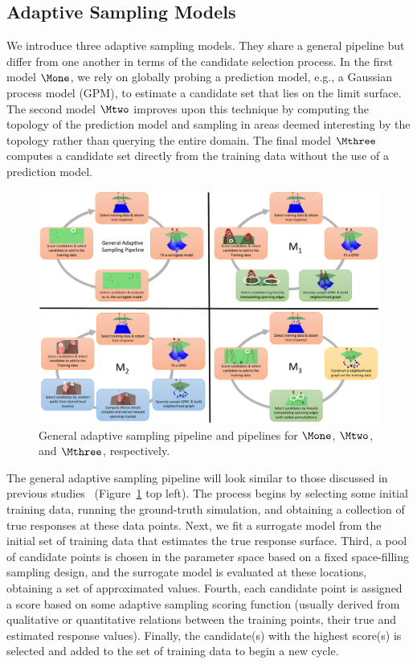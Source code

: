 \subsection{Adaptive Sampling Models}
\label{sec:pipelines}

We introduce three adaptive sampling models.
%
They share a general pipeline but differ from one another in terms of the candidate selection process.
%
In the first model $\Mone$, we rely on globally probing a prediction model, e.g., a Gaussian process model (GPM), to estimate a candidate set that lies on the limit surface.
%
The second model $\Mtwo$ improves upon this technique by computing the topology of the prediction model and sampling in areas deemed interesting by the topology rather than querying the entire domain.
%
The final model $\Mthree$ computes a candidate set directly from the training data without the use of a prediction model.

\begin{figure}[!ht]
\centering
\includegraphics[width=1.0\textwidth]{figs/chap5/pipelines}
\caption[Limit surface adaptive sampling pipelines]{General adaptive sampling pipeline and pipelines for $\protect\Mone$, $\protect\Mtwo$, and $\protect\Mthree$, respectively.}
\label{fig:pipelines}
\end{figure}

The general adaptive sampling pipeline will look similar to those discussed in previous studies~\cite{MaljovecWangKupresanin2013} (Figure~\ref{fig:pipelines} top left).
%
The process begins by selecting some initial training data, running the ground-truth simulation, and obtaining a collection of true responses at these data points.
%
Next, we fit a surrogate model from the initial set of training data that estimates the true response surface.
%
Third, a pool of candidate points is chosen in the parameter space based on a fixed space-filling sampling design, and the surrogate model is evaluated at these locations, obtaining a set of approximated values.
%
Fourth, each candidate point is assigned a score based on some adaptive sampling scoring function (usually derived from qualitative or quantitative relations between the training points, their true and estimated response values).
%
Finally, the candidate(s) with the highest score(s) is selected and added to the set of training data to begin a new cycle.


